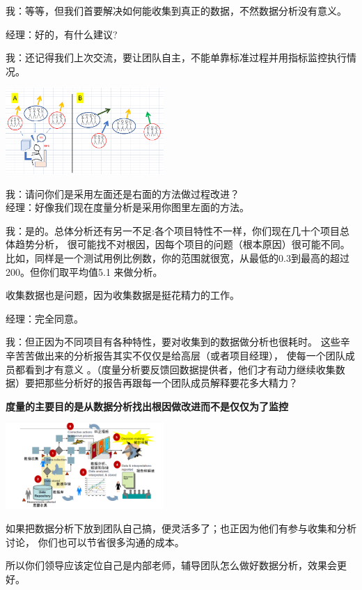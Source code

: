 我：等等，但我们首要解决如何能收集到真正的数据，不然数据分析没有意义。

经理：好的，有什么建议?

我：还记得我们上次交流，要让团队自主，不能单靠标准过程并用指标监控执行情况。


\includegraphics[width=6cm]{Diagram_20.png}

我：请问你们是采用左面还是右面的方法做过程改进？\\
经理：好像我们现在度量分析是采用你图里左面的方法。

我：是的。总体分析还有另一不足:各个项目特性不一样，你们现在几十个项目总体趋势分析，
很可能找不对根因，因每个项目的问题（根本原因）很可能不同。
比如，同样是一个测试用例比例数，你的范围就很宽，从最低的0.3到最高的超过200。但你们取平均值5.1
来做分析。

收集数据也是问题，因为收集数据是挺花精力的工作。

经理：完全同意。

我：但正因为不同项目有各种特性，要对收集到的数据做分析也很耗时。
这些辛辛苦苦做出来的分析报告其实不仅仅是给高层（或者项目经理），
使每一个团队成员都看到才有意义
。（度量分析要反馈回数据提供者，他们才有动力继续收集数据）要把那些分析好的报告再跟每一个团队成员解释要花多大精力？

\textbf{度量的主要目的是从数据分析找出根因做改进而不是仅仅为了监控}


\includegraphics[width=6cm]{Ma4CarScreenshot_2021-12-27_205004.png}

如果把数据分析下放到团队自己搞，便灵活多了；也正因为他们有参与收集和分析讨论，
你们也可以节省很多沟通的成本。

所以你们领导应该定位自己是内部老师，辅导团队怎么做好数据分析，效果会更好。

